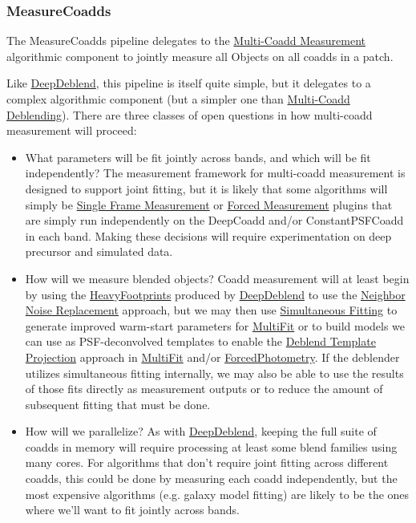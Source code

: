 \subsubsection{MeasureCoadds}
\label{sec:drpMeasureCoadds}

The MeasureCoadds pipeline delegates to the \hyperref[sec:acMultiCoaddMeasurement]{Multi-Coadd Measurement} algorithmic component to jointly measure all Objects on all coadds in a patch.

Like \hyperref[sec:drpDeepDeblend]{DeepDeblend}, this pipeline is itself quite simple, but it delegates to a complex algorithmic component (but a simpler one than \hyperref[sec:acMultiCoaddDeblending]{Multi-Coadd Deblending}).  There are three classes of open questions in how multi-coadd measurement will proceed:
\begin{itemize}
\item What parameters will be fit jointly across bands, and which will be fit independently?  The measurement framework for multi-coadd measurement is designed to support joint fitting, but it is likely that some algorithms will simply be \hyperref[sec:acSingleFrameMeasurement]{Single Frame Measurement} or \hyperref[sec:acForcedMeasurement]{Forced Measurement} plugins that are simply run independently on the DeepCoadd and/or ConstantPSFCoadd in each band.  Making these decisions will require experimentation on deep precursor and simulated data.
\item How will we measure blended objects?  Coadd measurement will at least begin by using the \hyperref[sec:spFootprints]{HeavyFootprints} produced by \hyperref[sec:drpDeepDeblend]{DeepDeblend} to use the \hyperref[sec:acReplaceNeighborsWithNoise]{Neighbor Noise Replacement} approach, but we may then use \hyperref[sec:acSimultaneousFitting]{Simultaneous Fitting} to generate improved warm-start parameters for \hyperref[sec:drpMultiFit]{MultiFit} or to build models we can use as PSF-deconvolved templates to enable the \hyperref[sec:acDeblendTemplateProjection]{Deblend Template Projection} approach in \hyperref[sec:drpMultiFit]{MultiFit} and/or \hyperref[sec:drpForcedPhotometry]{ForcedPhotometry}.  If the deblender utilizes simultaneous fitting internally, we may also be able to use the results of those fits directly as measurement outputs or to reduce the amount of subsequent fitting that must be done.
\item How will we parallelize?  As with \hyperref[sec:drpDeepDeblend]{DeepDeblend}, keeping the full suite of coadds in memory will require processing at least some blend families using many cores.  For algorithms that don't require joint fitting across different coadds, this could be done by measuring each coadd independently, but the most expensive algorithms (e.g. galaxy model fitting) are likely to be the ones where we'll want to fit jointly across bands.
\end{itemize}

